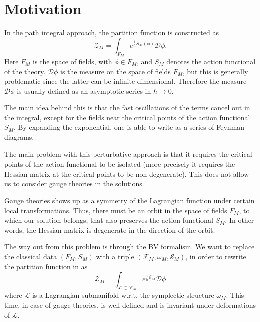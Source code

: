 \section{Motivation}
\label{sec:motivation}

In the path integral approach, the partition function is constructed as 
\begin{equation}
\label{eq:parti_func}
    \mathcal{Z}_M = \int_{F_M} e^{\frac{i}{\hbar}S_M(\phi)} \mathcal{D}\phi .
\end{equation}
Here $F_M$ is the space of fields, with $\phi \in F_M$, and $S_M$ denotes the action functional of the theory.
$\mathcal{D} \phi$ is the measure on the space of fields $F_M$, but this is generally problematic since the latter can be infinite dimensional.
Therefore the measure $\mathcal{D} \phi$ is usually defined as an asymptotic series in $\hbar \rightarrow 0$.

The main idea behind this is that the fast oscillations of the terms cancel out in the integral, except for the fields near the critical points of the action functional $S_M$.
By expanding the exponential, one is able to write  as a series of Feynman diagrams.

The main problem with this perturbative approach is that it requires the critical points of the action functional to be isolated (more precisely it requires the Hessian matrix at the critical points to be non-degenerate).
This does not allow us to consider gauge theories in the solutions.

Gauge theories shows up as a symmetry of the Lagrangian function under certain local transformations.
Thus, there must be an orbit in the space of fields $F_M$, to which our solution belongs, that also preserves the action functional $S_M$.
In other words, the Hessian matrix is degenerate in the direction of the orbit.

The way out from this problem is through the BV formalism.
We want to replace the classical data $(F_M, S_M)$ with a triple $(\mathcal{F}_M, \omega_M, \mathcal{S}_M)$, in order to rewrite the partition function in   as
\begin{equation}
\label{eq:part_func_M}
    \mathcal{Z}_M = \int_{\mathcal{L} \subset \mathcal{F}_M} e^{\frac{i}{\hbar} \mathcal{S}_M} \mathcal{D} \phi
\end{equation}
where $\mathcal{L}$ is a Lagrangian submanifold w.r.t. the symplectic structure $\omega_M$.
This time, in case of gauge theories,  is well-defined and is invariant under deformations of $\mathcal{L}$.